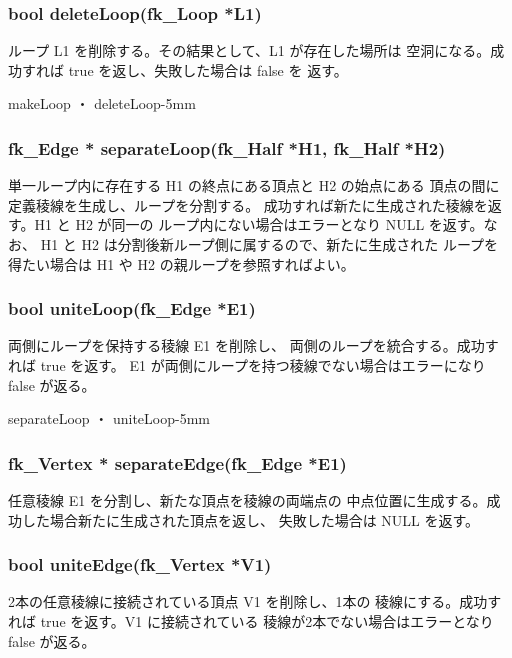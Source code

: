  \subsubsection*{\hspace*{0.6cm}bool deleteLoop(fk\_Loop *L1)}
	ループ L1 を削除する。その結果として、L1 が存在した場所は
	空洞になる。成功すれば true を返し、失敗した場合は false を
	返す。

	{makeLoop ・ deleteLoop}{-5mm}

 \subsubsection*{\hspace*{0.6cm}fk\_Edge *
	separateLoop(fk\_Half *H1, fk\_Half *H2)}
	単一ループ内に存在する H1 の終点にある頂点と H2 の始点にある
	頂点の間に定義稜線を生成し、ループを分割する。
	成功すれば新たに生成された稜線を返す。H1 と H2 が同一の
	ループ内にない場合はエラーとなり NULL を返す。なお、
	H1 と H2 は分割後新ループ側に属するので、新たに生成された
	ループを得たい場合は H1 や H2 の親ループを参照すればよい。

 \subsubsection*{\hspace*{0.6cm}bool uniteLoop(fk\_Edge *E1)}
	両側にループを保持する稜線 E1 を削除し、
	両側のループを統合する。成功すれば true を返す。
	E1 が両側にループを持つ稜線でない場合はエラーになり false が返る。

	{separateLoop ・ uniteLoop}{-5mm}

 \subsubsection*{\hspace*{0.6cm}fk\_Vertex * separateEdge(fk\_Edge *E1)}
	任意稜線 E1 を分割し、新たな頂点を稜線の両端点の
	中点位置に生成する。成功した場合新たに生成された頂点を返し、
	失敗した場合は NULL を返す。

 \subsubsection*{\hspace*{0.6cm}bool uniteEdge(fk\_Vertex *V1)}
	2本の任意稜線に接続されている頂点 V1 を削除し、1本の
	稜線にする。成功すれば true を返す。V1 に接続されている
	稜線が2本でない場合はエラーとなり false が返る。

